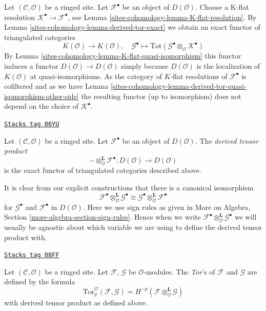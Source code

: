 Let $(\mathcal{C}, \mathcal{O})$ be a ringed site.
Let $\mathcal{F}^\bullet$ be an object of $D(\mathcal{O})$.
Choose a K-flat resolution $\mathcal{K}^\bullet \to \mathcal{F}^\bullet$, see
Lemma \ref{sites-cohomology-lemma-K-flat-resolution}.
By
Lemma \ref{sites-cohomology-lemma-derived-tor-exact}
we obtain an exact functor of triangulated categories
$$
K(\mathcal{O})
\longrightarrow
K(\mathcal{O}),
\quad
\mathcal{G}^\bullet
\longmapsto
\text{Tot}(\mathcal{G}^\bullet \otimes_\mathcal{O} \mathcal{K}^\bullet)
$$
By
Lemma \ref{sites-cohomology-lemma-K-flat-quasi-isomorphism}
this functor induces a functor
$D(\mathcal{O}) \to D(\mathcal{O})$ simply because
$D(\mathcal{O})$ is the localization of $K(\mathcal{O})$
at quasi-isomorphisms.
As the category of $K$-flat resolutions of $\mathcal{F}^\bullet$ is
cofiltered and as we have
Lemma \ref{sites-cohomology-lemma-derived-tor-quasi-isomorphism-other-side}
the resulting functor (up to isomorphism)
does not depend on the choice of $\mathcal{K}^\bullet$.

\begin{definition}
\label{sites-cohomology-definition-derived-tor}
\href{https://stacks.math.columbia.edu/tag/06YU}{\texttt{Stacks tag 06YU}}

Let $(\mathcal{C}, \mathcal{O})$ be a ringed site.
Let $\mathcal{F}^\bullet$ be an object of $D(\mathcal{O})$.
The {\it derived tensor product}
$$
- \otimes_\mathcal{O}^{\mathbf{L}} \mathcal{F}^\bullet :
D(\mathcal{O})
\longrightarrow
D(\mathcal{O})
$$
is the exact functor of triangulated categories described above.
\end{definition}

It is clear from our explicit constructions that
there is a canonical isomorphism
$$
\mathcal{F}^\bullet \otimes_\mathcal{O}^{\mathbf{L}} \mathcal{G}^\bullet
\cong
\mathcal{G}^\bullet \otimes_\mathcal{O}^{\mathbf{L}} \mathcal{F}^\bullet
$$
for $\mathcal{G}^\bullet$ and $\mathcal{F}^\bullet$ in $D(\mathcal{O})$.
Here we use sign rules as given in More on Algebra, Section
\ref{more-algebra-section-sign-rules}. Hence when we write
$\mathcal{F}^\bullet \otimes_\mathcal{O}^{\mathbf{L}} \mathcal{G}^\bullet$
we will usually be agnostic about which variable we are using to
define the derived tensor product with.

\begin{definition}[Tor]
\label{sites-cohomology-definition-tor}
\href{https://stacks.math.columbia.edu/tag/08FF}{\texttt{Stacks tag 08FF}}

Let $(\mathcal{C}, \mathcal{O})$ be a ringed site.
Let $\mathcal{F}$, $\mathcal{G}$ be $\mathcal{O}$-modules.
The {\it Tor}'s of $\mathcal{F}$ and $\mathcal{G}$ are defined by
the formula
$$
\text{Tor}_p^\mathcal{O}(\mathcal{F}, \mathcal{G}) =
H^{-p}(\mathcal{F} \otimes_\mathcal{O}^\mathbf{L} \mathcal{G})
$$
with derived tensor product as defined above.
\end{definition}

